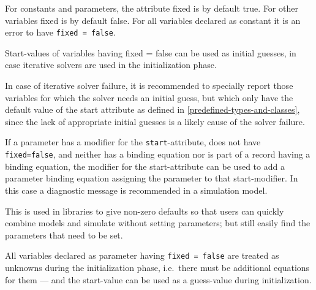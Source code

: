 For constants and parameters, the attribute fixed is by default true.
For other variables fixed is by default false. For all variables
declared as constant it is an error to have \lstinline!fixed = false!.

Start-values of variables having fixed = false can be used as initial
guesses, in case iterative solvers are used in the initialization phase.

\begin{nonnormative}
In case of iterative solver failure, it is recommended to specially report those variables for which the solver needs an initial guess, but which only have the default
value of the start attribute as defined in \autoref{predefined-types-and-classes}, since the lack of appropriate initial guesses is a likely cause of the solver failure.
\end{nonnormative}

If a parameter has a modifier for the \lstinline!start!-attribute, does not have
\lstinline!fixed=false!, and neither has a binding equation nor is part of a record
having a binding equation, the modifier for the start-attribute can be
used to add a parameter binding equation assigning the parameter to that
start-modifier. In this case a diagnostic message is recommended in a
simulation model.

\begin{nonnormative}
This is used in libraries to give non-zero defaults so that users can quickly combine models and simulate without setting parameters; but still easily find the parameters
that need to be set.
\end{nonnormative}

All variables declared as parameter having \lstinline!fixed = false! are treated as
unknowns during the initialization phase, i.e.\ there must be additional
equations for them --- and the start-value can be used as a guess-value
during initialization.

